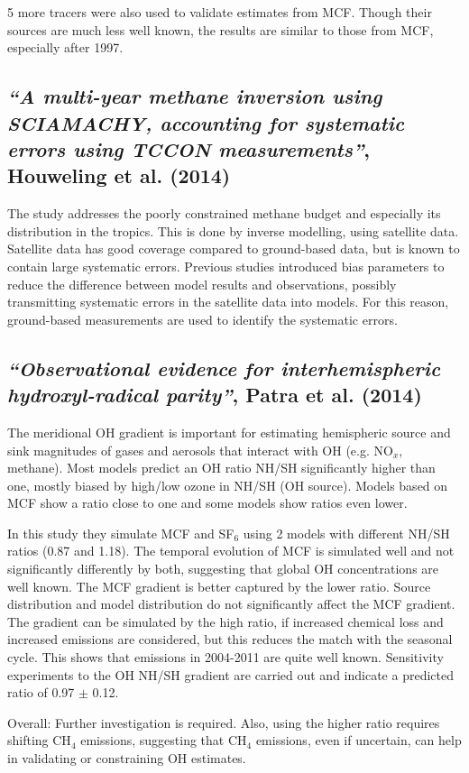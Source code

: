 \documentclass{article}
\begin{document}
5 more tracers were also used to validate estimates from MCF. Though their sources are much less well known, the results are similar to those from MCF, especially after 1997.

\subsection{\textit{“A multi-year methane inversion using SCIAMACHY, accounting for systematic errors using TCCON measurements”}, Houweling et al. (2014)}
The study addresses the poorly constrained methane budget and especially its distribution in the tropics. This is done by inverse modelling, using satellite data. Satellite data has good coverage compared to ground-based data, but is known to contain large systematic errors.
Previous studies introduced bias parameters to reduce the difference between model results and observations, possibly transmitting systematic errors in the satellite data into models. For this reason, ground-based measurements are used to identify the systematic errors. 

\subsection{\textit{“Observational evidence for interhemispheric hydroxyl-radical parity”}, Patra et al. (2014)}
The meridional OH gradient is important for estimating hemispheric source and sink magnitudes of gases and aerosols that interact with OH (e.g. NO$_x$, methane). Most models predict an OH ratio NH/SH significantly higher than one, mostly biased by high/low ozone in NH/SH (OH source). Models based on MCF show a ratio close to one and some models show ratios even lower.

In this study they simulate MCF and SF$_6$ using 2 models with different NH/SH ratios (0.87 and 1.18). The temporal evolution of MCF is simulated well and not significantly differently by both, suggesting that global OH concentrations are well known. The MCF gradient is better captured by the lower ratio. Source distribution and model distribution do not significantly affect the MCF gradient. The gradient can be simulated by the high ratio, if increased chemical loss and increased emissions are considered, but this reduces the match with the seasonal cycle. This shows that emissions in 2004-2011 are quite well known. Sensitivity experiments to the OH NH/SH gradient are carried out and indicate a predicted ratio of 0.97 $\pm$ 0.12.

Overall: Further investigation is required. Also, using the higher ratio requires shifting CH$_4$ emissions, suggesting that CH$_4$ emissions, even if uncertain, can help in validating or constraining OH estimates.
\end{document}
